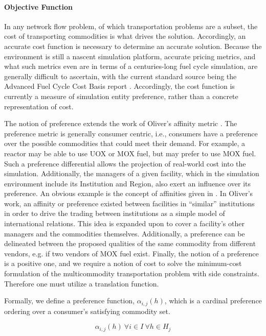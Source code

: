 \paragraph{Objective Function}

In any network flow problem, of which transportation problems are a subset, the
cost of transporting commodities is what drives the solution. Accordingly, an
accurate cost function is necessary to determine an accurate solution. Because
the \Cyclus environment is still a nascent simulation platform, accurate pricing
metrics, and what such metrics even are in terms of a centuries-long fuel cycle
simulation, are generally difficult to ascertain, with the current standard source
being the Advanced Fuel Cycle Cost Basis
report \cite{shropshire_advanced_2009}. Accordingly, the cost function is
currently a measure of simulation entity preference, rather than a concrete
representation of cost.

The notion of preference extends the work of Oliver's affinity metric
\cite{oliver_geniusv2:_2009}. The preference metric is generally consumer
centric, i.e., consumers have a preference over the possible commodities that
could meet their demand. For example, a reactor may be able to use UOX or MOX
fuel, but may prefer to use MOX fuel. Such a preference differential allows the
projection of real-world cost into the simulation. Additionally, the managers of
a given facility, which in the \Cyclus simulation environment include its
Institution and Region, also exert an influence over its preference. An obvious
example is the concept of affinities given in \cite{oliver_geniusv2:_2009}. In
Oliver's work, an affinity or preference existed between facilities in
``similar'' institutions in order to drive the trading between institutions as a
simple model of international relations. This idea is expanded upon to cover a
facility's other managers and the commodities themselves. Additionally, a
preference can be delineated between the proposed qualities of the same
commodity from different vendors, e.g. if two vendors of MOX fuel
exist. Finally, the notion of a preference is a positive one, and we require a
notion of cost to solve the minimum-cost formulation of the multicommodity
transportation problem with side constraints. Therefore one must utilize a
translation function.

Formally, we define a preference function, $\alpha_{i,j}(h)$, which is a
cardinal preference ordering over a consumer's satisfying commodity set.

\begin{equation}
\alpha_{i,j}(h) \: \forall i \in I \: \forall h \in H_{j} 
\end{equation}

